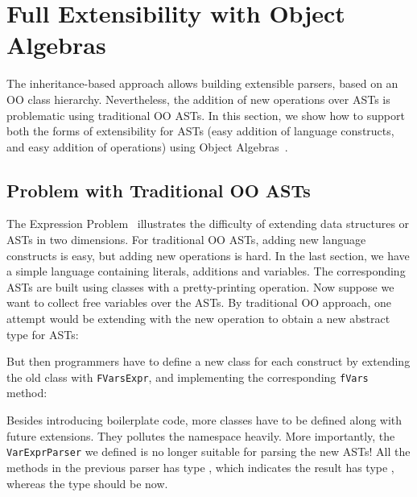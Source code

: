 \section{Full Extensibility with Object Algebras}\label{sec:algebrasandparsing}

The inheritance-based approach allows building extensible parsers, based on an OO class hierarchy.  Nevertheless, the addition of new operations over ASTs is problematic using traditional OO ASTs. In this section, we
show how to support both the forms of extensibility for ASTs (easy
addition of language constructs, and easy addition of operations)
using Object Algebras~\cite{Oliveira:2012}.

\subsection{Problem with Traditional OO ASTs}\label{subsec:problemwithoutoa}

The Expression Problem~\cite{wadler1998expression} illustrates the difficulty of extending data structures or ASTs in two dimensions. For traditional OO ASTs, adding new language constructs is easy, but adding new operations is hard. In the last section, we have a simple language containing literals, additions and variables. The corresponding ASTs are built using classes with a pretty-printing operation. Now suppose we want to collect free variables over the ASTs. By traditional OO approach, one attempt would be extending  with the new operation to obtain a new abstract type for ASTs:


But then programmers have to define a new class for each construct by extending the old class with \lstinline{FVarsExpr}, and implementing the corresponding \lstinline{fVars} method:


Besides introducing boilerplate code, more classes have to be defined along with future extensions. They pollutes the namespace heavily. More importantly, the \lstinline{VarExprParser} we defined is no longer suitable for parsing the new ASTs! All the methods in the previous parser has type , which indicates the result has type , whereas the type should be  now.

